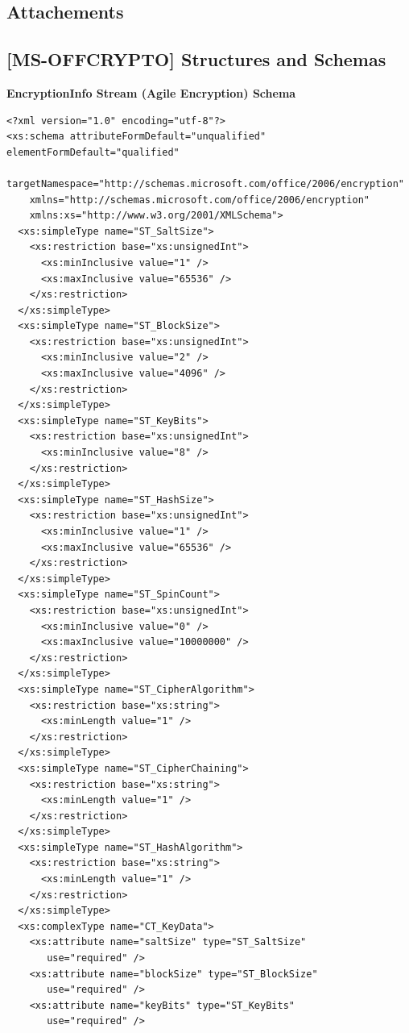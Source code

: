 \documentclass[11pt,oneside]{fithesis2}
\begin{document}
\begin{appendix}
	\chapter{Attachements}
	\section{[MS-OFFCRYPTO] Structures and Schemas}
	\textbf{EncryptionInfo Stream (Agile Encryption) Schema}\label{ei_agile_stream}
	\begin{lstlisting}
<?xml version="1.0" encoding="utf-8"?>
<xs:schema attributeFormDefault="unqualified" elementFormDefault="qualified"
    targetNamespace="http://schemas.microsoft.com/office/2006/encryption"
    xmlns="http://schemas.microsoft.com/office/2006/encryption"
    xmlns:xs="http://www.w3.org/2001/XMLSchema">
  <xs:simpleType name="ST_SaltSize">
    <xs:restriction base="xs:unsignedInt">
      <xs:minInclusive value="1" />
      <xs:maxInclusive value="65536" />
    </xs:restriction> 
  </xs:simpleType> 
  <xs:simpleType name="ST_BlockSize">
    <xs:restriction base="xs:unsignedInt">
      <xs:minInclusive value="2" /> 
      <xs:maxInclusive value="4096" />
    </xs:restriction> 
  </xs:simpleType> 
  <xs:simpleType name="ST_KeyBits"> 
    <xs:restriction base="xs:unsignedInt"> 
      <xs:minInclusive value="8" /> 
    </xs:restriction> 
  </xs:simpleType> 
  <xs:simpleType name="ST_HashSize"> 
    <xs:restriction base="xs:unsignedInt">
      <xs:minInclusive value="1" /> 
      <xs:maxInclusive value="65536" /> 
    </xs:restriction> 
  </xs:simpleType> 
  <xs:simpleType name="ST_SpinCount"> 
    <xs:restriction base="xs:unsignedInt"> 
      <xs:minInclusive value="0" /> 
      <xs:maxInclusive value="10000000" /> 
    </xs:restriction>
  </xs:simpleType> 
  <xs:simpleType name="ST_CipherAlgorithm"> 
    <xs:restriction base="xs:string"> 
      <xs:minLength value="1" /> 
    </xs:restriction> 
  </xs:simpleType>
  <xs:simpleType name="ST_CipherChaining"> 
    <xs:restriction base="xs:string"> 
      <xs:minLength value="1" /> 
    </xs:restriction> 
  </xs:simpleType> 
  <xs:simpleType name="ST_HashAlgorithm"> 
    <xs:restriction base="xs:string"> 
      <xs:minLength value="1" /> 
    </xs:restriction> 
  </xs:simpleType>
  <xs:complexType name="CT_KeyData"> 
    <xs:attribute name="saltSize" type="ST_SaltSize" 
       use="required" /> 
    <xs:attribute name="blockSize" type="ST_BlockSize"
       use="required" /> 
    <xs:attribute name="keyBits" type="ST_KeyBits"
       use="required" /> 

\end{lstlisting}
\end{appendix}
\end{document}
